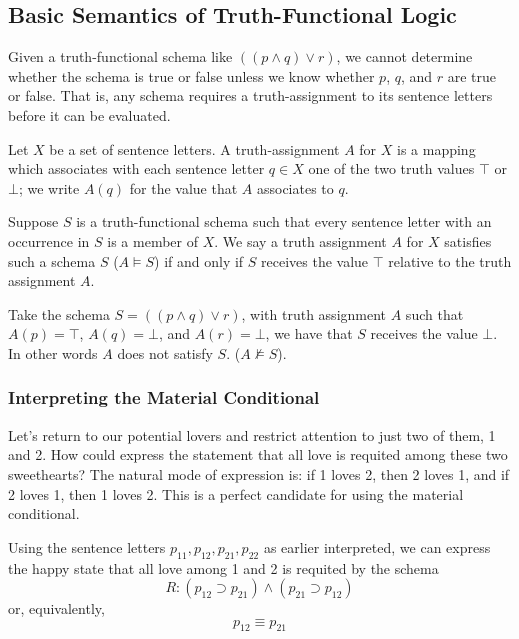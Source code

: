 \subsection{Basic Semantics of Truth-Functional Logic}

Given a truth-functional schema like $((p \wedge q) \vee r)$, we cannot determine whether the schema is true or false unless we know whether $p$, $q$, and $r$ are true or false. That is, any schema requires a truth-assignment to its sentence letters before it can be evaluated. 

\begin{definition}
Let $X$ be a set of sentence letters. A truth-assignment $A$ for $X$ is a mapping which associates with each sentence letter $q\in X$ one of the two truth values $\top$ or $\bot$; we write $A(q)$ for the value that $A$ associates to $q$. 

Suppose $S$ is a truth-functional schema such that every sentence letter with an occurrence in $S$ is a member of $X$. We say a truth assignment $A$ for $X$ satisfies such a schema $S$ ($A\models S$) if and only if $S$ receives the value $\top$ relative to the truth assignment $A$. 
\end{definition}

\begin{example}
Take the schema $S = ((p \wedge q) \vee r)$, with truth assignment $A$ such that $A(p) = \top$, $A(q) = \bot$, and $A(r) = \bot$, we have that $S$ receives the value $\bot$. In other words $A$ does not satisfy $S$. ($A \not \models S$).
\end{example}

\subsubsection*{Interpreting the Material Conditional}
Let's return to our potential lovers and restrict attention to just two of them, 1 and 2. How could express the statement that all love is requited among these two sweethearts? The natural mode of expression is: if 1 loves 2, then 2 loves 1, and if 2 loves 1, then 1 loves 2. This is a perfect candidate for using the material conditional.

Using the sentence letters $p_{11}, p_{12}, p_{21}, p_{22}$ as earlier interpreted, we can express the happy state that all love among 1 and 2 is requited by the schema
\[ 
    R: (p_{12}\supset p_{21}) \wedge (p_{21}\supset p_{12})
\]
or, equivalently, 
\[
    p_{12} \equiv p_{21}
\]


